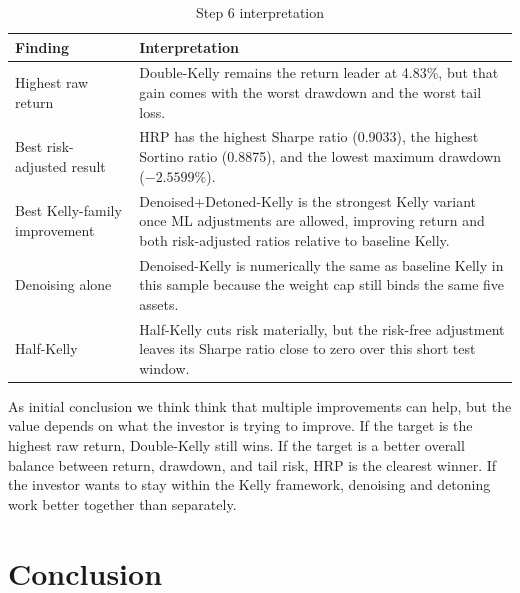 \documentclass[11pt,a4paper]{article}
\begin{document}
\begin{table}[H]
\centering
\caption{Step 6 interpretation}
\label{tab:step6_takeaways}
{\small\setlength{\tabcolsep}{4pt}\renewcommand{\arraystretch}{1.15}\begin{tabularx}{\textwidth}{>{\raggedright\arraybackslash}p{3.6cm} X}
\toprule
Finding & Interpretation \\
\midrule
Highest raw return & Double-Kelly remains the return leader at 4.83\%, but that gain comes with the worst drawdown and the worst tail loss. \\
Best risk-adjusted result & HRP has the highest Sharpe ratio (0.9033), the highest Sortino ratio (0.8875), and the lowest maximum drawdown ($-2.5599\%$). \\
Best Kelly-family improvement & Denoised+Detoned-Kelly is the strongest Kelly variant once ML adjustments are allowed, improving return and both risk-adjusted ratios relative to baseline Kelly. \\
Denoising alone & Denoised-Kelly is numerically the same as baseline Kelly in this sample because the weight cap still binds the same five assets. \\
Half-Kelly & Half-Kelly cuts risk materially, but the risk-free adjustment leaves its Sharpe ratio close to zero over this short test window. \\
\bottomrule
\end{tabularx}}
\end{table}

As initial conclusion we think think that multiple improvements can help, but the value
depends on what the investor is trying to improve. If the target is the highest raw return,
Double-Kelly still wins. If the target is a better overall balance between return, drawdown, and
tail risk, HRP is the clearest winner. If the investor wants to stay within the Kelly framework,
denoising and detoning work better together than separately.
\section{Conclusion}
\end{document}
